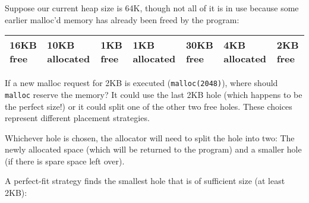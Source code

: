 Suppose our current heap size is 64K, though not all of it is in use
because some earlier malloc'd memory has already been freed by the
program:

\begin{longtable}[c]{@{}lllllll@{}}
\toprule
\begin{minipage}[b]{0.04\columnwidth}\raggedright\strut
16KB free
\strut\end{minipage} &
\begin{minipage}[b]{0.04\columnwidth}\raggedright\strut
10KB allocated
\strut\end{minipage} &
\begin{minipage}[b]{0.04\columnwidth}\raggedright\strut
1KB free
\strut\end{minipage} &
\begin{minipage}[b]{0.04\columnwidth}\raggedright\strut
1KB allocated
\strut\end{minipage} &
\begin{minipage}[b]{0.04\columnwidth}\raggedright\strut
30KB free
\strut\end{minipage} &
\begin{minipage}[b]{0.04\columnwidth}\raggedright\strut
4KB allocated
\strut\end{minipage} &
\begin{minipage}[b]{0.04\columnwidth}\raggedright\strut
2KB free
\strut\end{minipage}\tabularnewline
\midrule
\endhead
\bottomrule
\end{longtable}

If a new malloc request for 2KB is executed (\texttt{malloc(2048)}),
where should \texttt{malloc} reserve the memory? It could use the last
2KB hole (which happens to be the perfect size!) or it could split one
of the other two free holes. These choices represent different placement
strategies.

Whichever hole is chosen, the allocator will need to split the hole into
two: The newly allocated space (which will be returned to the program)
and a smaller hole (if there is spare space left over).

A perfect-fit strategy finds the smallest hole that is of sufficient
size (at least 2KB):

